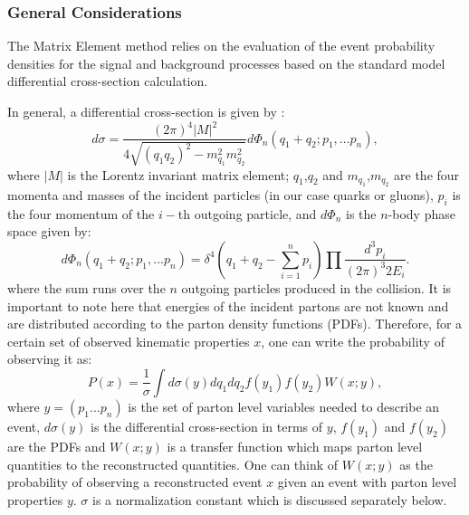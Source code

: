 \subsubsection{General Considerations}
The Matrix Element method relies on the evaluation of the event probability densities for the signal and background processes based on the 
standard model differential cross-section calculation. 

In general, a differential cross-section is given by \cite{ref:PDG}:
\begin{equation}
d\sigma=\frac{(2\pi)^{4} \left| M \right|^{2}}{4\sqrt{(q_{1}q_{2})^{2}-m_{q_{1}}^{2}m_{q_{2}}^{2}}}d\Phi_{n}(q_{1}+q_{2};p_{1},...p_{n}),
\label{eqn:DiffXsecGeneral}  
\end{equation}
where $\left| M \right|$ is the Lorentz invariant matrix element;
$q_{1}$,$q_{2}$ and $m_{q_{1}}$,$m_{q_{2}}$ are the four momenta and masses of the incident particles 
(in our case quarks or gluons), 
$p_i$ is the four momentum of the $i-$th outgoing particle, 
and $d\Phi_{n}$ is the $n$-body phase space given by:
\begin{equation}
d\Phi_{n}(q_{1}+q_{2};p_{1},...p_{n})=\delta^{4}(q_{1}+q_{2}-\sum_{i=1}^{n}{p_{i}})\prod\frac{d^{3}p_{i}}{(2\pi)^{3}2E_{i}}.
\label{eqn:PhaseSpaceGeneral}  
\end{equation}
where the sum runs over the $n$ outgoing particles produced in the collision.
It is important to note here that energies of the incident partons are not known and are distributed according to the parton density 
functions (PDFs). Therefore, for a certain set of observed kinematic properties $x$, one can write the probability of observing it as:
\begin{equation}
P(x)=\frac{1}{\sigma}\int d\sigma(y)dq_{1}dq_{2}f(y_{1})f(y_{2})W(x;y),
\label{eqn:EvtProbGeneral}  
\end{equation}
where $y=(p_{1}...p_{n})$ is the set of parton level variables needed to describe an event, $d\sigma(y)$ is the differential cross-section 
in terms of $y$, $f(y_{1})$ and $f(y_{2})$ are the PDFs and $W(x;y)$ is a transfer function which maps parton level quantities to the 
reconstructed quantities.  One can think of $W(x;y)$ as the probability of observing a reconstructed event $x$ given an event with parton level properties $y$. $\sigma$ is a normalization constant which is discussed separately below.

